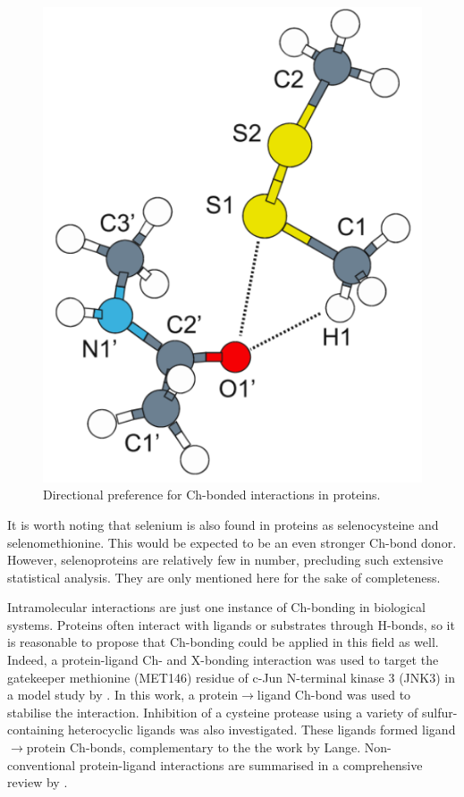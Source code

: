 \begin{refsection}
\begin{figure}
    \centering
    \includegraphics[width=0.4\linewidth]{Figures/amide-diselenide-ch-bond.pdf}
    \caption{Directional preference for Ch-bonded interactions in proteins.}\label{fig:amide-diselenide-ch-bond}
\end{figure}

It is worth noting that selenium is also found in proteins as selenocysteine and selenomethionine.
This would be expected to be an even stronger Ch-bond donor.
However, selenoproteins are relatively few in number, precluding such extensive statistical analysis.\autocite{Iwaoka2015}
They are only mentioned here for the sake of completeness.

Intramolecular interactions are just one instance of Ch-bonding in biological systems.
Proteins often interact with ligands or substrates through H-bonds, so it is reasonable to propose that Ch-bonding could be applied in this field as well.
Indeed, a protein-ligand Ch- and X-bonding interaction was used to target the gatekeeper methionine (MET146) residue of c-Jun N-terminal kinase 3 (JNK3) in a model study by \citeauthor{Lange2015}.\autocite{Lange2015}
In this work, a protein$ \rightarrow $ligand Ch-bond was used to stabilise the interaction.
Inhibition of a cysteine protease using a variety of sulfur-containing heterocyclic ligands was also investigated.\autocite{Giroud2017}
These ligands formed ligand$ \rightarrow $protein Ch-bonds, complementary to the the work by Lange.
Non-conventional protein-ligand interactions are summarised in a comprehensive review by \citeauthor{Beno2015}.\autocite{Beno2015}


\end{refsection}
